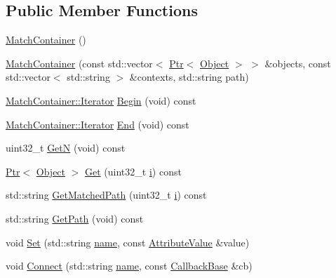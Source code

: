 \subsection*{Public Member Functions}
\begin{DoxyCompactItemize}
\item 
\hyperlink{classns3_1_1Config_1_1MatchContainer_a8b14e9933fa9f87a3837e4e53de9b57f}{Match\+Container} ()
\item 
\hyperlink{classns3_1_1Config_1_1MatchContainer_ad98f2fce0dc8e2df59d219e6dc524c11}{Match\+Container} (const std\+::vector$<$ \hyperlink{classns3_1_1Ptr}{Ptr}$<$ \hyperlink{classns3_1_1Object}{Object} $>$ $>$ \&objects, const std\+::vector$<$ std\+::string $>$ \&contexts, std\+::string path)
\item 
\hyperlink{classns3_1_1Config_1_1MatchContainer_a00de4b7cc8ea02e8e33209f92e65fa0f}{Match\+Container\+::\+Iterator} \hyperlink{classns3_1_1Config_1_1MatchContainer_a2e43e17fd626a590ec5f53e6fea4fcbd}{Begin} (void) const 
\item 
\hyperlink{classns3_1_1Config_1_1MatchContainer_a00de4b7cc8ea02e8e33209f92e65fa0f}{Match\+Container\+::\+Iterator} \hyperlink{classns3_1_1Config_1_1MatchContainer_a2d1d324e932a984033ffdf1a61784d9c}{End} (void) const 
\item 
uint32\+\_\+t \hyperlink{classns3_1_1Config_1_1MatchContainer_a2866fc381b5d9e0e017ca374bcf8b682}{GetN} (void) const 
\item 
\hyperlink{classns3_1_1Ptr}{Ptr}$<$ \hyperlink{classns3_1_1Object}{Object} $>$ \hyperlink{classns3_1_1Config_1_1MatchContainer_a719fa121985ff7d596619649a983749d}{Get} (uint32\+\_\+t \hyperlink{lte__uplink__power__control_8m_a6f6ccfcf58b31cb6412107d9d5281426}{i}) const 
\item 
std\+::string \hyperlink{classns3_1_1Config_1_1MatchContainer_aae1e5d11fca5100f2c3c406d4a21678a}{Get\+Matched\+Path} (uint32\+\_\+t \hyperlink{lte__uplink__power__control_8m_a6f6ccfcf58b31cb6412107d9d5281426}{i}) const 
\item 
std\+::string \hyperlink{classns3_1_1Config_1_1MatchContainer_a6db9324ec6b91f67e11e8ddc6e5a25f9}{Get\+Path} (void) const 
\item 
void \hyperlink{classns3_1_1Config_1_1MatchContainer_a4d946efb9907c1625581617402274fa3}{Set} (std\+::string \hyperlink{generate__test__data__lte__spectrum__model_8m_ab74e6bf80237ddc4109968cedc58c151}{name}, const \hyperlink{classns3_1_1AttributeValue}{Attribute\+Value} \&value)
\item 
void \hyperlink{classns3_1_1Config_1_1MatchContainer_a3faec88bf2938163282336eef46e21ee}{Connect} (std\+::string \hyperlink{generate__test__data__lte__spectrum__model_8m_ab74e6bf80237ddc4109968cedc58c151}{name}, const \hyperlink{classns3_1_1CallbackBase}{Callback\+Base} \&cb)

\end{DoxyCompactItemize}
